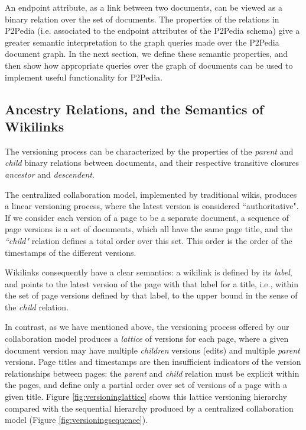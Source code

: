 An endpoint attribute, as a link between two documents, can be viewed as a binary relation over the set of documents. The properties of the relations in P2Pedia (i.e. associated to the endpoint attributes of the P2Pedia schema) give a greater semantic interpretation to the graph queries made over  the P2Pedia document graph. In the next section, we define these semantic properties, and then show how appropriate queries over the graph of documents can be used to implement useful functionality for P2Pedia.

\subsection{Ancestry Relations, and the Semantics of Wikilinks}
\label{sec:ancestry}
The versioning process can be characterized by the properties of the \emph{parent} and \emph{child} binary relations between documents, and their respective transitive closures \emph{ancestor} and \emph{descendent}. 

The centralized collaboration model, implemented by traditional wikis, produces a linear versioning process, where the latest version is considered ``authoritative". If we consider each version of a page to be a separate document, a sequence of page versions is a set of documents, which all have the same page title, and the \emph{``child"} relation defines a total order over this set. This order is the order of the timestamps of the different versions. 

Wikilinks consequently have a clear semantics: a wikilink is defined by its \emph{label}, and points to the latest version of the page with that label for a title, i.e., within the set of page versions defined by that label, to the upper bound in the sense of the \emph{child} relation. 

In contrast, as we have mentioned above, the versioning process offered by our collaboration model produces a \emph{lattice} of versions for each page, where a given document version may have multiple \emph{children} versions (edits) and multiple \emph{parent} versions. Page titles and timestamps are then insufficient indicators of the version relationships between pages: the \emph{parent} and \emph{child} relation must be explicit within the pages, and define only a partial order over set of versions of a page with a given title. Figure \ref{fig:versioninglattice} shows this lattice versioning hierarchy compared with the sequential hierarchy produced by a centralized collaboration model (Figure \ref{fig:versioningsequence}). 

